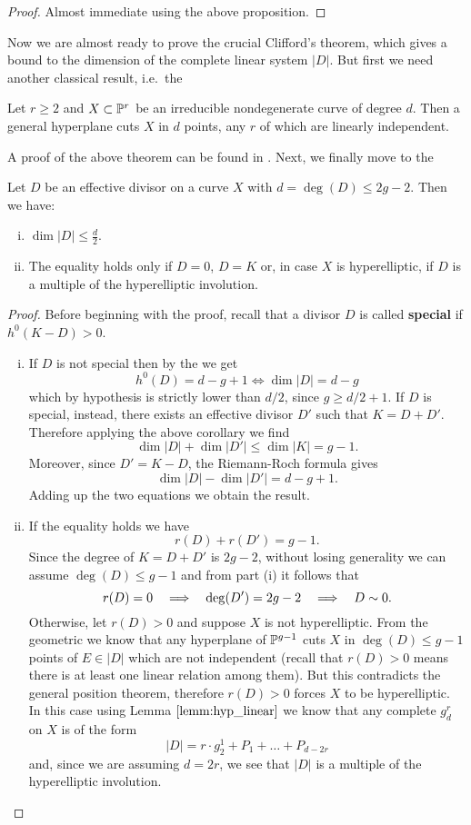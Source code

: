 	\begin{proof}
		Almost immediate using the above proposition.
	\end{proof}
	Now we are almost ready to prove the crucial Clifford's theorem, which gives a bound to the dimension of the complete linear system $|D|$. But first we need another classical result, i.e.\ the
	\begin{namedtheo}\label{thm:GPT}
		Let $r\geq 2$ and $X\subset \mathbb{P}^r$ be an irreducible nondegenerate curve of degree $d$. Then a general hyperplane cuts $X$ in $d$	points, any $r$ of which are linearly independent.
	\end{namedtheo}
	A proof of the above theorem can be found in \cite{GAC}. Next, we finally move to the
	\begin{namedtheo}\label{thm:Clifford}
		Let $D$ be an effective divisor on a curve $X$ with $d = \deg(D) \leq 2g-2$. Then we have:
		\begin{enumerate}[(i)]
			\item $ \dim|D| \leq \frac{d}{2}. $
			\item The equality holds only if $D=0$, $D=K$ or, in case $X$ is hyperelliptic, if $D$ is a multiple of the hyperelliptic involution.
		\end{enumerate}
	\end{namedtheo}
	\begin{proof}
		Before beginning with the proof, recall that a divisor $D$ is called \textbf{special} if $h^0(K-D) > 0$.
		\begin{enumerate}[(i)]
			\item If $D$ is not special then by the \RR we get
			$$ h^0(D) = d-g+1 \iff \dim|D| = d-g $$
			which by hypothesis is strictly lower than $d/2$, since $g \geq d/2+1 $. If $D$ is special, instead, there exists an effective divisor $D'$ such that $K=D+D'$. Therefore applying the above corollary we find
			$$ \dim|D| + \dim|D'| \leq \dim|K| = g-1.  $$
			Moreover, since $D' = K-D$, the Riemann-Roch formula gives
			$$ \dim|D| - \dim|D'| = d - g + 1. $$
			Adding up the two equations we obtain the result.
			
			\item If the equality holds we have
			$$ r(D) + r(D') = g-1.  $$
			Since the degree of $K=D+D'$ is $2g-2$, without losing generality we can assume $\deg(D)\leq g-1$ and from part (i) it follows that 
			$$ r(D)=0 \quad \Longrightarrow \quad \deg(D')=2g-2 \quad \Longrightarrow \quad D\sim 0. $$ 
			Otherwise, let $r(D)>0$ and suppose $X$ is not hyperelliptic. From the geometric \RR we know that any hyperplane of $\mathbb{P}^{g-1}$ cuts $X$ in $\deg(D)\leq g-1$ points of $E\in|D|$ which are not independent (recall that $r(D)>0$ means there is at least one linear relation among them). But this contradicts the general position theorem, therefore $r(D)>0$ forces $X$ to be hyperelliptic. In this case using Lemma $\ref{lemm:hyp_linear}$ we know that any complete $g_d^r$ on $X$ is of the form
			$$ |D| = r\cdot g_2^1 + P_1 + \dots + P_{d-2r} $$
			and, since we are assuming $d=2r$, we see that $|D|$ is a multiple of the hyperelliptic involution.
		\end{enumerate}
	\end{proof}

